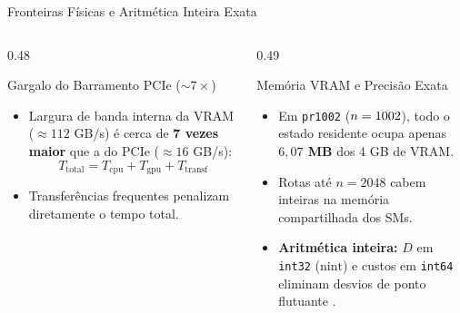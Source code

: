 \begin{frame}{Fronteiras Físicas e Aritmética Inteira Exata}
  \begin{columns}[T,onlytextwidth]
    \begin{column}{0.48\textwidth}
      \begin{block}{Gargalo do Barramento PCIe ($\sim 7\times$)}
        \begin{itemize}
          \item Largura de banda interna da VRAM ($\approx 112$ GB/s) é cerca de \textbf{7 vezes maior} que a do PCIe ($\approx 16$ GB/s):
                \[
                  T_{\text{total}} = T_{\text{cpu}} + T_{\text{gpu}} + T_{\text{transf}}
                \]
          \item Transferências frequentes penalizam diretamente o tempo total.
        \end{itemize}
      \end{block}
    \end{column}
    \begin{column}{0.49\textwidth}
      \begin{block}{Memória VRAM e Precisão Exata}
        \begin{itemize}
          \item Em \texttt{pr1002} ($n=1002$), todo o estado residente ocupa apenas \textbf{$6{,}07$ MB} dos 4 GB de VRAM.
          \item Rotas até $n=2048$ cabem inteiras na memória compartilhada dos SMs.
          \item \textbf{Aritmética inteira:} $D$ em \texttt{int32} ($\text{nint}$) e custos em \texttt{int64} eliminam desvios de ponto flutuante \autocite{reinelt1991tsplib}.
        \end{itemize}
      \end{block}
    \end{column}
  \end{columns}
\end{frame}

